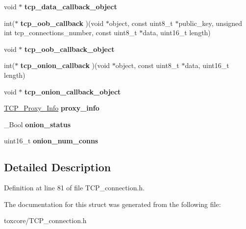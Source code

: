 \begin{DoxyCompactItemize}
\item 
\hypertarget{struct_t_c_p___connections_a7374235c800f886578e032a878618568}{void $\ast$ {\bfseries tcp\+\_\+data\+\_\+callback\+\_\+object}}\label{struct_t_c_p___connections_a7374235c800f886578e032a878618568}

\item 
\hypertarget{struct_t_c_p___connections_a758941f7bcf27ba64ae59503bef4ee06}{int($\ast$ {\bfseries tcp\+\_\+oob\+\_\+callback} )(void $\ast$object, const uint8\+\_\+t $\ast$public\+\_\+key, unsigned int tcp\+\_\+connections\+\_\+number, const uint8\+\_\+t $\ast$data, uint16\+\_\+t length)}\label{struct_t_c_p___connections_a758941f7bcf27ba64ae59503bef4ee06}

\item 
\hypertarget{struct_t_c_p___connections_aa008021141b9c1d9861a06d12b495f55}{void $\ast$ {\bfseries tcp\+\_\+oob\+\_\+callback\+\_\+object}}\label{struct_t_c_p___connections_aa008021141b9c1d9861a06d12b495f55}

\item 
\hypertarget{struct_t_c_p___connections_ad92f3faa26e9b50df859c26416692b01}{int($\ast$ {\bfseries tcp\+\_\+onion\+\_\+callback} )(void $\ast$object, const uint8\+\_\+t $\ast$data, uint16\+\_\+t length)}\label{struct_t_c_p___connections_ad92f3faa26e9b50df859c26416692b01}

\item 
\hypertarget{struct_t_c_p___connections_a16e85b0c2c930afee6a25f7229c7116e}{void $\ast$ {\bfseries tcp\+\_\+onion\+\_\+callback\+\_\+object}}\label{struct_t_c_p___connections_a16e85b0c2c930afee6a25f7229c7116e}

\item 
\hypertarget{struct_t_c_p___connections_aa737023350cf47e63993e3b4dc9a7472}{\hyperlink{struct_t_c_p___proxy___info}{T\+C\+P\+\_\+\+Proxy\+\_\+\+Info} {\bfseries proxy\+\_\+info}}\label{struct_t_c_p___connections_aa737023350cf47e63993e3b4dc9a7472}

\item 
\hypertarget{struct_t_c_p___connections_a4eead70704aaec336687c7a248a22522}{\+\_\+\+Bool {\bfseries onion\+\_\+status}}\label{struct_t_c_p___connections_a4eead70704aaec336687c7a248a22522}

\item 
\hypertarget{struct_t_c_p___connections_a6e6576b39dc12d06b344fae03ba2d772}{uint16\+\_\+t {\bfseries onion\+\_\+num\+\_\+conns}}\label{struct_t_c_p___connections_a6e6576b39dc12d06b344fae03ba2d772}

\end{DoxyCompactItemize}


\subsection{Detailed Description}


Definition at line 81 of file T\+C\+P\+\_\+connection.\+h.



The documentation for this struct was generated from the following file\+:\begin{DoxyCompactItemize}
\item 
toxcore/T\+C\+P\+\_\+connection.\+h\end{DoxyCompactItemize}
